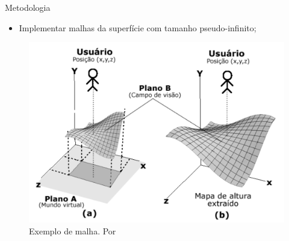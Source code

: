 \begin{frame}{Metodologia}
    \begin{itemize}
        \item Implementar malhas da superfície com tamanho pseudo-infinito;
        
    \end{itemize}
    
    \begin{figure}[H]
        \centering
        \includegraphics[width=.6\textwidth, height=.5\textheight]{img/malhaPInf}
        \caption{Exemplo de malha. Por \cite{bevilacquaferramenta}}
        \label{fig:malhaPInf}
    \end{figure}
    
    
    
\end{frame}

